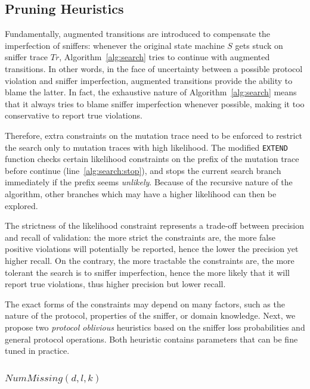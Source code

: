\subsection{Pruning Heuristics}
\label{subsec:heuristic}

Fundamentally, augmented transitions are introduced to compensate the
imperfection of sniffers: whenever the original state machine $S$ gets stuck on
sniffer trace $Tr$, Algorithm~\ref{alg:search} tries to continue with augmented
transitions. In other words, in the face of uncertainty between a possible
protocol violation and sniffer imperfection, augmented transitions provide the
ability to blame the latter. In fact, the exhaustive nature of
Algorithm~\ref{alg:search} means that it always tries to blame sniffer
imperfection whenever possible, making it too conservative to report true
violations.

Therefore, extra constraints on the mutation trace need to be enforced to
restrict the search only to mutation traces with high likelihood.
The modified
\texttt{EXTEND} function checks certain likelihood constraints on the prefix of
the mutation trace before continue (line~\ref{alg:search:stop}), and stops the
current search branch immediately if the prefix seems \textit{unlikely}.
Because of the recursive nature of the algorithm, other branches which may have
a higher likelihood can then be explored.

The strictness of the likelihood constraint represents a trade-off between
precision and recall of validation: the more strict the constraints are, the
more false positive violations will potentially be reported, hence the lower the
precision yet higher recall.  On the contrary, the more tractable the
constraints are, the more tolerant the search is to sniffer imperfection, hence
the more likely that it will report true violations, thus higher precision but
lower recall.

The exact forms of the constraints may depend on many factors, such as the
nature of the protocol, properties of the sniffer, or domain knowledge.  Next,
we propose two \textit{protocol oblivious} heuristics based on the sniffer loss
probabilities and general protocol operations. Both heuristic contains
parameters that can be fine tuned in practice.

\subsubsection{$NumMissing(d, l, k)$}

